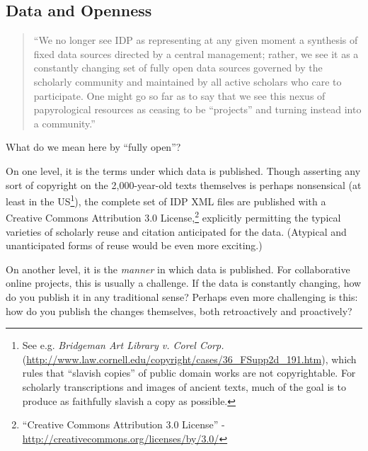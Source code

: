 \documentclass[]{article}
\begin{document}
\subsection*{Data and Openness}

\begin{quote}
“We no longer see IDP as representing at any given moment a synthesis of fixed data sources directed by a central management; rather, we see it as a constantly changing set of fully open data sources governed by the scholarly community and maintained by all active scholars who care to participate. One might go so far as to say that we see this nexus of papyrological resources as ceasing to be “projects” and turning instead into a community.”
\end{quote}

What do we mean here by “fully open”?

On one level, it is the terms under which data is published.
Though asserting any sort of copyright on the 2,000-year-old texts themselves is perhaps nonsensical (at least in the US\footnote{See e.g. \emph{Bridgeman Art Library v. Corel Corp.} (\url{http://www.law.cornell.edu/copyright/cases/36_FSupp2d_191.htm}), which rules that “slavish copies” of public domain works are not copyrightable. For scholarly transcriptions and images of ancient texts, much of the goal is to produce as faithfully slavish a copy as possible.}), the complete set of IDP XML files are published with a Creative Commons Attribution 3.0 License,\footnote{“Creative Commons Attribution 3.0 License” - \url{http://creativecommons.org/licenses/by/3.0/}} explicitly permitting the typical varieties of scholarly reuse and citation anticipated for the data. (Atypical and unanticipated forms of reuse would be even more exciting.)

On another level, it is the \emph{manner} in which data is published. For collaborative online projects, this is usually a challenge. If the data is constantly changing, how do you publish it in any traditional sense? Perhaps even more challenging is this: how do you publish the changes themselves, both retroactively and proactively?
\end{document}
